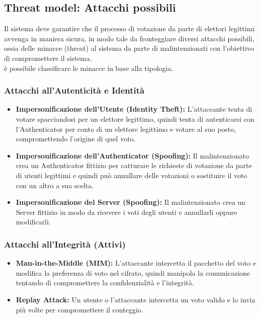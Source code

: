 	\begin{figure}[H]
		\centering
		\scalebox{0.6}{}
	\end{figure}

\divider

\subsection{Threat model: Attacchi possibili}
	Il sistema deve garantire che il processo di votazione da parte di elettori legittimi avvenga in maniera sicura, in modo tale da fronteggiare diversi attacchi possibili, ossia delle minacce (threat) al sistema da parte di malintenzionati con l'obiettivo di compromettere il sistema.\\
	è possibile classificare le minacce in base alla tipologia.
	
	\subsubsection{Attacchi all'Autenticità e Identità}
		\begin{itemize}
			\item \textbf{Impersonificazione dell'Utente (Identity Theft):}  L'attaccante tenta di votare spacciandosi per un elettore legittimo, quindi tenta di autenticarsi con l'Authenticator per conto di un elettore legittimo e votare al suo posto, compromettendo l'origine di quel voto. 
			
			\item \textbf{Impersonificazione dell'Authenticator (Spoofing):}
			Il malintenzionato crea un Authenticator fittizio per catturare le richieste di votazione da parte di utenti legittimi e quindi può annullare delle votazioni o sostituire il voto con un altro a sua scelta.
			
			\item \textbf{Impersonificazione del Server (Spoofing):}
			Il malintenzionato crea un Server fittizio in modo da ricevere i voti degli utenti e annullarli oppure modificarli.
		\end{itemize}
	
	\subsubsection{Attacchi all'Integrità (Attivi)}
		\begin{itemize}
			\item \textbf{Man-in-the-Middle (MIM):} L'attaccante intercetta il pacchetto del voto e modifica la preferenza di voto nel cifrato, quindi manipola la comunicazione tentando di compromettere la confidenzialità e l'integrità.

			\item \textbf{Replay Attack:} Un utente o l'attaccante intercetta un voto valido e lo invia più volte per compromettere il conteggio.
		\end{itemize}
		
